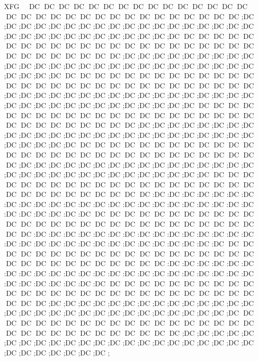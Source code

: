 XFG                        DC DC DC DC DC DC DC DC DC DC DC DC DC DC DC DC DC DC DC DC DC DC DC DC DC DC DC DC DC DC DC ;DC ;DC ;DC ;DC ;DC ;DC ;DC ;DC ;DC ;DC ;DC ;DC ;DC ;DC ;DC ;DC ;DC ;DC ;DC ;DC ;DC ;DC ;DC ;DC ;DC ;DC ;DC ;DC ;DC ;                                                                                                                        DC DC DC DC DC DC DC DC DC DC DC DC DC DC DC DC DC DC DC DC DC DC DC DC DC DC DC DC DC DC DC ;DC ;DC ;DC ;DC ;DC ;DC ;DC ;DC ;DC ;DC ;DC ;DC ;DC ;DC ;DC ;DC ;DC ;DC ;DC ;DC ;DC ;DC ;DC ;DC ;DC ;DC ;DC ;DC ;DC ;                                                                                                                        DC DC DC DC DC DC DC DC DC DC DC DC DC DC DC DC DC DC DC DC DC DC DC DC DC DC DC DC DC DC DC ;DC ;DC ;DC ;DC ;DC ;DC ;DC ;DC ;DC ;DC ;DC ;DC ;DC ;DC ;DC ;DC ;DC ;DC ;DC ;DC ;DC ;DC ;DC ;DC ;DC ;DC ;DC ;DC ;DC ;                                                                                                                        DC DC DC DC DC DC DC DC DC DC DC DC DC DC DC DC DC DC DC DC DC DC DC DC DC DC DC DC DC DC DC ;DC ;DC ;DC ;DC ;DC ;DC ;DC ;DC ;DC ;DC ;DC ;DC ;DC ;DC ;DC ;DC ;DC ;DC ;DC ;DC ;DC ;DC ;DC ;DC ;DC ;DC ;DC ;DC ;DC ;                                                                                                                        DC DC DC DC DC DC DC DC DC DC DC DC DC DC DC DC DC DC DC DC DC DC DC DC DC DC DC DC DC DC DC ;DC ;DC ;DC ;DC ;DC ;DC ;DC ;DC ;DC ;DC ;DC ;DC ;DC ;DC ;DC ;DC ;DC ;DC ;DC ;DC ;DC ;DC ;DC ;DC ;DC ;DC ;DC ;DC ;DC ;                                                                                                                        DC DC DC DC DC DC DC DC DC DC DC DC DC DC DC DC DC DC DC DC DC DC DC DC DC DC DC DC DC DC DC :DC :DC :DC :DC :DC :DC :DC :DC :DC :DC :DC :DC :DC :DC :DC :DC :DC :DC :DC :DC :DC :DC :DC :DC :DC :DC :DC :DC :DC :                                                                                                                        DC DC DC DC DC DC DC DC DC DC DC DC DC DC DC DC DC DC DC DC DC DC DC DC DC DC DC DC DC DC DC :DC :DC :DC :DC :DC :DC :DC :DC :DC :DC :DC :DC :DC :DC :DC :DC :DC :DC :DC :DC :DC :DC :DC :DC :DC :DC :DC :DC :DC :                                                                                                                        DC DC DC DC DC DC DC DC DC DC DC DC DC DC DC DC DC DC DC DC DC DC DC DC DC DC DC DC DC DC DC :DC :DC :DC :DC :DC :DC :DC :DC :DC :DC :DC :DC :DC :DC :DC :DC :DC :DC :DC :DC :DC :DC :DC :DC :DC :DC :DC :DC :DC :                                                                                                                        DC DC DC DC DC DC DC DC DC DC DC DC DC DC DC DC DC DC DC DC DC DC DC DC DC DC DC DC DC DC DC ;DC ;DC ;DC ;DC ;DC ;DC ;DC ;DC ;DC ;DC ;DC ;DC ;DC ;DC ;DC ;DC ;DC ;DC ;DC ;DC ;DC ;DC ;DC ;DC ;DC ;DC ;DC ;DC ;DC ;                                                                                                                        DC DC DC DC DC DC DC DC DC DC DC DC DC DC DC DC DC DC DC DC DC DC DC DC DC DC DC DC DC DC DC ;DC ;DC ;DC ;DC ;DC ;DC ;DC ;DC ;DC ;DC ;DC ;DC ;DC ;DC ;DC ;DC ;DC ;DC ;DC ;DC ;DC ;DC ;DC ;DC ;DC ;DC ;DC ;DC ;DC ;                                                                                                                        